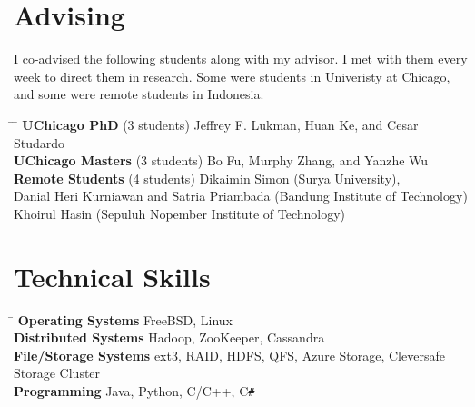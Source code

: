 \documentclass[10pt]{article} %
\begin{document}
\section{Advising}

I co-advised the following students along with my advisor. I met with them
every week to direct them in research. Some were students in Univeristy at
Chicago, and some were remote students in Indonesia.
\begin{tabbing}
\hspace{3.5cm} \= \hspace{2.5cm} \= \kill
\textbf{UChicago PhD} \> (3 students) \> Jeffrey F. Lukman, Huan Ke, and Cesar Studardo\\
\textbf{UChicago Masters} \> (3 students) \> Bo Fu, Murphy Zhang, and Yanzhe Wu\\
\textbf{Remote Students} \> (4 students) \> Dikaimin Simon (Surya University),\\
\> \>Danial Heri Kurniawan and Satria Priambada (Bandung Institute of Technology)\\
\> \>Khoirul Hasin (Sepuluh Nopember Institute of Technology)
\end{tabbing}


\section{Technical Skills}

\begin{tabbing}
\hspace{4cm} \= \kill
\textbf{Operating Systems} \> FreeBSD, Linux \\
\textbf{Distributed Systems} \> Hadoop, ZooKeeper, Cassandra \\
\textbf{File/Storage Systems} \> ext3, RAID, HDFS, QFS, Azure Storage, Cleversafe Storage Cluster\\
\textbf{Programming} \> Java, Python, C/C++, C\texttt{\#}
\end{tabbing}
\end{document}
